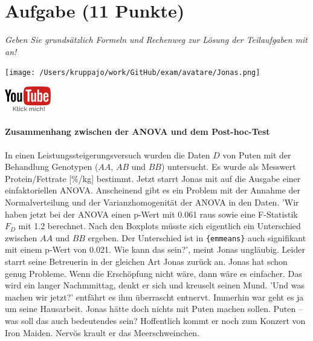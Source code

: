 \documentclass[a4paper, 9pt]{scrartcl}\usepackage[]{graphicx}\usepackage[]{xcolor}
\begin{document}
 
\clearpage

\section{Aufgabe \hfill (11 Punkte)}

\textit{Geben Sie grundsätzlich Formeln und Rechenweg zur Lösung der Teilaufgaben mit an!} \\[1Ex]
 

 
\ifcollection
\begin{flushright}
\tiny\vspace{-3Ex}
\textbf{\examinhaltstart}
\exammodulebiostat
\vspace{-4Ex}
\end{flushright}
\begin{minipage}[t]{0.5\textwidth}
\texttt{[image: /Users/kruppajo/work/GitHub/exam/avatare/Jonas.png]}
\end{minipage}
\begin{minipage}[t]{0.5\textwidth}
\hfill
\href{https://youtu.be/M9Uhm67ndxM}{\includegraphics[width = 2cm]{img/youtube}}
\end{minipage}
\vspace{-3Ex}
\fi



\ifcollection
\paragraph{Zusammenhang zwischen der ANOVA und dem Post-hoc-Test}
\fi

In einen Leistungssteigerungsversuch wurden die Daten $D$ von Puten mit der Behandlung Genotypen ($AA$, $AB$ und $BB$) untersucht. Es wurde als Messwert Protein/Fettrate [\%/kg] bestimmt. Jetzt starrt Jonas mit auf die \Rlogo Ausgabe einer einfaktoriellen ANOVA. Anscheinend gibt es ein Problem mit der Annahme der Normalverteilung und der Varianzhomogenität der ANOVA in den Daten. 'Wir haben jetzt bei der ANOVA einen p-Wert mit 0.061 raus sowie eine F-Statistik $F_D$ mit 1.2 berechnet. Nach den Boxplots müsste sich eigentlich ein Unterschied zwischen $AA$ und $BB$ ergeben. Der Unterschied ist in \texttt{\{emmeans\}} auch signifikant mit einem p-Wert von 0.021. Wie kann das sein?', meint Jonas ungläubig. Leider starrt seine Betreuerin in der gleichen Art Jonas zurück an. Jonas hat schon genug Probleme. Wenn die Erschöpfung nicht wäre, dann wäre es einfacher. Das wird ein langer Nachmmittag, denkt er sich und kreuselt seinen Mund. 'Und was machen wir jetzt?' entfährt es ihm überrascht entnervt. Immerhin war geht es ja um seine Hausarbeit. Jonas hätte doch nichts mit Puten machen sollen. Puten -- was soll das auch bedeutendes sein? Hoffentlich kommt er noch zum Konzert von Iron Maiden. Nervös krault er das Meerschweinchen.
\end{document}
